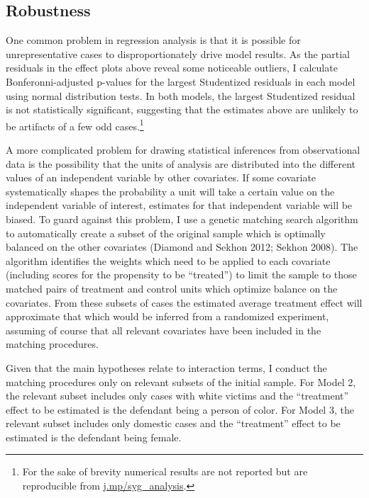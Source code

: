 \documentclass[12pt,article]{article}
\begin{document}
\subsection{Robustness}\label{robustness}

One common problem in regression analysis is that it is possible for
unrepresentative cases to disproportionately drive model results. As the
partial residuals in the effect plots above reveal some noticeable
outliers, I calculate Bonferonni-adjusted p-values for the largest
Studentized residuals in each model using normal distribution tests. In
both models, the largest Studentized residual is not statistically
significant, suggesting that the estimates above are unlikely to be
artifacts of a few odd cases.\footnote{For the sake of brevity numerical
  results are not reported but are reproducible from
  \href{http://j.mp/syg_analysis}{j.mp/syg\_analysis}.}

A more complicated problem for drawing statistical inferences from
observational data is the possibility that the units of analysis are
distributed into the different values of an independent variable by
other covariates. If some covariate systematically shapes the
probability a unit will take a certain value on the independent variable
of interest, estimates for that independent variable will be biased. To
guard against this problem, I use a genetic matching search algorithm to
automatically create a subset of the original sample which is optimally
balanced on the other covariates (Diamond and Sekhon 2012; Sekhon 2008).
The algorithm identifies the weights which need to be applied to each
covariate (including scores for the propensity to be ``treated'') to
limit the sample to those matched pairs of treatment and control units
which optimize balance on the covariates. From these subsets of cases
the estimated average treatment effect will approximate that which would
be inferred from a randomized experiment, assuming of course that all
relevant covariates have been included in the matching procedures.

Given that the main hypotheses relate to interaction terms, I conduct
the matching procedures only on relevant subsets of the initial sample.
For Model 2, the relevant subset includes only cases with white victims
and the ``treatment'' effect to be estimated is the defendant being a
person of color. For Model 3, the relevant subset includes only domestic
cases and the ``treatment'' effect to be estimated is the defendant
being female.
\end{document}
